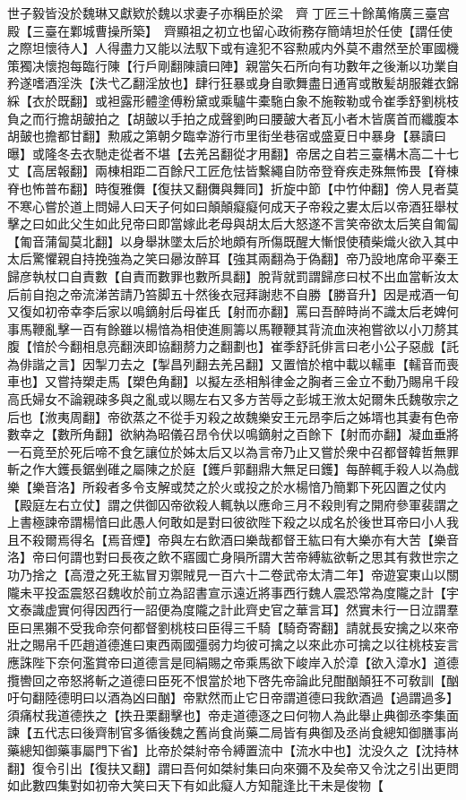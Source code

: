 世子毅皆没於魏琳又獻欵於魏以求妻子亦稱臣於梁　齊丁匠三十餘萬脩廣三臺宫殿【三臺在鄴城曹操所築】　齊顯祖之初立也留心政術務存簡靖坦於任使【謂任使之際坦懷待人】人得盡力又能以法馭下或有違犯不容勲戚内外莫不肅然至於軍國機策獨决懷抱每臨行陳【行戶剛翻陳讀曰陣】親當矢石所向有功數年之後漸以功業自矜遂嗜酒淫泆【泆弋乙翻淫放也】肆行狂暴或身自歌舞盡日通宵或散髪胡服雜衣錦綵【衣於既翻】或袒露形體塗傅粉黛或乘驢牛橐駞白象不施鞍勒或令崔季舒劉桃枝負之而行擔胡皷拍之【胡皷以手拍之成聲劉昫曰腰皷大者瓦小者木皆廣首而纖腹本胡皷也擔都甘翻】勲戚之第朝夕臨幸游行市里街坐巷宿或盛夏日中暴身【暴讀曰曝】或隆冬去衣馳走從者不堪【去羌呂翻從才用翻】帝居之自若三臺構木高二十七丈【高居報翻】兩棟相距二百餘尺工匠危怯皆繫繩自防帝登脊疾走殊無怖畏【脊棟脊也怖普布翻】時復雅儛【復扶又翻儛與舞同】折旋中節【中竹仲翻】傍人見者莫不寒心嘗於道上問婦人曰天子何如曰顛顛癡癡何成天子帝殺之婁太后以帝酒狂舉杖擊之曰如此父生如此兒帝曰即當嫁此老母與胡太后大怒遂不言笑帝欲太后笑自匍匐【匍音蒲匐莫北翻】以身舉牀墜太后於地頗有所傷既醒大慚恨使積柴熾火欲入其中太后驚懼親自持挽強為之笑曰曏汝醉耳【強其兩翻為于偽翻】帝乃設地席命平秦王歸彦執杖口自責數【自責而數罪也數所具翻】脫背就罰謂歸彦曰杖不出血當斬汝太后前自抱之帝流涕苦請乃笞脚五十然後衣冠拜謝悲不自勝【勝音升】因是戒酒一旬又復如初帝幸李后家以鳴鏑射后母崔氏【射而亦翻】罵曰吾醉時尚不識太后老婢何事馬鞭亂擊一百有餘雖以楊愔為相使進厠籌以馬鞭鞭其背流血浹袍嘗欲以小刀剺其腹【愔於今翻相息亮翻浹即協翻剺力之翻劃也】崔季舒託俳言曰老小公子惡戲【託為俳諧之言】因掣刀去之【掣昌列翻去羌呂翻】又置愔於棺中載以轜車【轜音而喪車也】又嘗持槊走馬【槊色角翻】以擬左丞相斛律金之胸者三金立不動乃賜帛千段高氏婦女不論親疎多與之亂或以賜左右又多方苦辱之彭城王浟太妃爾朱氏魏敬宗之后也【浟夷周翻】帝欲蒸之不從手刃殺之故魏樂安王元昂李后之姊壻也其妻有色帝數幸之【數所角翻】欲納為昭儀召昂令伏以鳴鏑射之百餘下【射而亦翻】凝血垂將一石竟至於死后啼不食乞讓位於姊太后又以為言帝乃止又嘗於衆中召都督韓哲無罪斬之作大鑊長鋸剉碓之屬陳之於庭【鑊戶郭翻鼎大無足曰鑊】每醉輒手殺人以為戲樂【樂音洛】所殺者多令支解或焚之於火或投之於水楊愔乃簡鄴下死囚置之仗内【殿庭左右立仗】謂之供御囚帝欲殺人輒執以應命三月不殺則宥之開府參軍裴謂之上書極諫帝謂楊愔曰此愚人何敢如是對曰彼欲陛下殺之以成名於後世耳帝曰小人我且不殺爾焉得名【焉音煙】帝與左右飲酒曰樂哉都督王紘曰有大樂亦有大苦【樂音洛】帝曰何謂也對曰長夜之飲不寤國亡身隕所謂大苦帝縛紘欲斬之思其有救世宗之功乃捨之【高澄之死王紘冒刃禦賊見一百六十二卷武帝太清二年】帝遊宴東山以關隴未平投盃震怒召魏收於前立為詔書宣示遠近將事西行魏人震恐常為度隴之計【宇文泰識虚實何得因西行一詔便為度隴之計此齊史官之華言耳】然實未行一日泣謂羣臣曰黑獺不受我命奈何都督劉桃枝曰臣得三千騎【騎奇寄翻】請就長安擒之以來帝壯之賜帛千匹趙道德進曰東西兩國彊弱力均彼可擒之以來此亦可擒之以往桃枝妄言應誅陛下奈何濫賞帝曰道德言是囘絹賜之帝乘馬欲下峻岸入於漳【欲入漳水】道德攬轡回之帝怒將斬之道德曰臣死不恨當於地下啓先帝論此兒酣酗顛狂不可敎訓【酗吁句翻陸德明曰以酒為凶曰酗】帝默然而止它日帝謂道德曰我飲酒過【過謂過多】須痛杖我道德抶之【抶丑栗翻擊也】帝走道德逐之曰何物人為此舉止典御丞李集面諫【五代志曰後齊制官多循後魏之舊尚食尚藥二局皆有典御及丞尚食總知御膳事尚藥總知御藥事屬門下省】比帝於桀紂帝令縛置流中【流水中也】沈没久之【沈持林翻】復令引出【復扶又翻】謂曰吾何如桀紂集曰向來彌不及矣帝又令沈之引出更問如此數四集對如初帝大笑曰天下有如此癡人方知龍逢比干未是俊物【